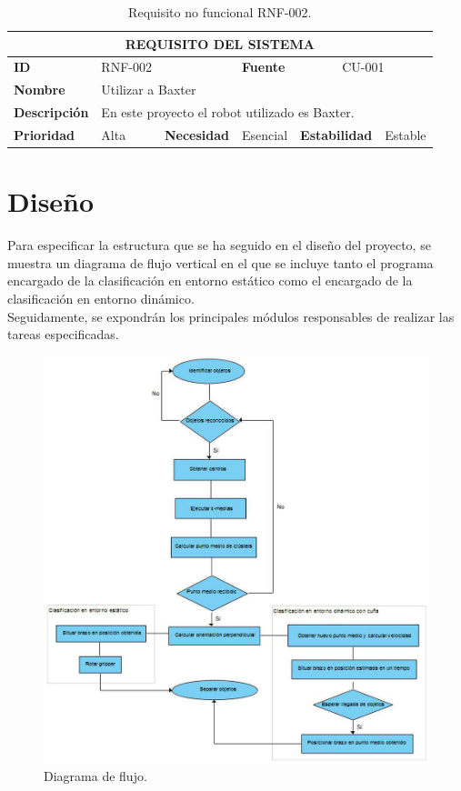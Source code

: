 \begin{table}[H]
	\centering
	\begin{tabular}{|p{2cm} | p{1.5cm} | p{2cm} | p{1.7cm} | p{2cm} | p{2cm} |}
		\hline
		\multicolumn{6}{|c|}{\textbf{REQUISITO DEL SISTEMA}} \\ 
		\hline
		\textbf{ID} & RNF-002 & & \textbf{Fuente} & \multicolumn{2}{c|}{CU-001} \\
		\hline
		\textbf{Nombre} & \multicolumn{5}{l|}{Utilizar a Baxter} \\
		\hline
		\textbf{Descripción} & \multicolumn{5}{l|}{\parbox{30em}{En este proyecto el robot utilizado es Baxter.}} \\
		\hline
		\textbf{Prioridad} & Alta & \textbf{Necesidad} & Esencial & \textbf{Estabilidad} & Estable \\
		\hline		
	\end{tabular}
	\caption{Requisito no funcional RNF-002.}
	\label{cuad:RNF-002}
\end{table}

\newpage
\section{Diseño}

\noindent Para especificar la estructura que se ha seguido en el diseño del proyecto, se muestra un diagrama de flujo vertical en el que se incluye tanto el programa encargado de la clasificación en entorno estático como el encargado de la clasificación en entorno dinámico.\\
\noindent Seguidamente, se expondrán los principales módulos responsables de realizar las tareas especificadas. \\

\begin{figure}[H]
	\label{cd:flowd}
	\centering %
	\includegraphics[scale=0.5]{imagenes/flowd.jpg}
	\caption{Diagrama de flujo.}
\end{figure}

